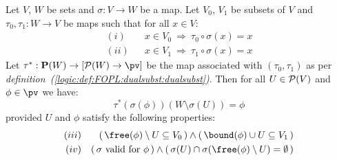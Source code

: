 \begin{lemma}\label{logic:lemma:FOPL:localinv:lem}
Let $V$, $W$ be sets and $\sigma:V\to W$ be a map. Let $V_{0}$,
$V_{1}$ be subsets of $V$ and $\tau_{0},\tau_{1}:W\to V$ be maps
such that for all $x\in V$:
   \begin{eqnarray*}
    (i)&&x\in V_{0}\ \Rightarrow\ \tau_{0}\circ\sigma(x)=x\\
    (ii)&&x\in V_{1}\ \Rightarrow\ \tau_{1}\circ\sigma(x)=x
    \end{eqnarray*}
Let $\tau^{*}:{\bf P}(W)\to[{\cal P}(W)\to\pv]$ be the map
associated with $(\tau_{0},\tau_{1})$ as per {\em
definition~(\ref{logic:def:FOPL:dualsubst:dualsubst})}. Then for all
$U\in{\cal P}(V)$ and $\phi\in\pv$ we have:
    \begin{equation}\label{logic:eqn:FOPL:localinv:lemma:1}
    \tau^{*}(\sigma(\phi))(W\setminus\sigma(U))=\phi
    \end{equation}
provided $U$ and $\phi$ satisfy the following properties:
    \begin{eqnarray*}
    (iii)&&(\,\free(\phi)\setminus U\subseteq V_{0}\,)
    \land(\,\bound(\phi)\cup U\subseteq V_{1}\,)\\
    (iv)&&(\,\mbox{$\sigma$ valid for $\phi$}\,)\land
    (\,\sigma(U)\cap\sigma(\free(\phi)\setminus U)=\emptyset\,)\\
    \end{eqnarray*}
\end{lemma}

